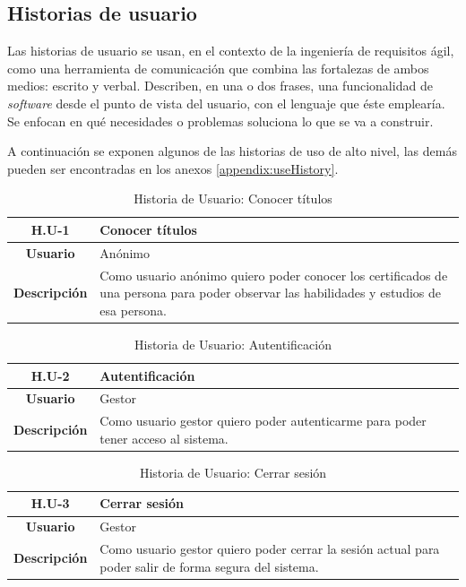 \subsection{Historias de usuario}
Las historias de usuario se usan, en el contexto de la ingeniería de requisitos ágil, como una herramienta de comunicación que combina las fortalezas de ambos medios: escrito y verbal. Describen, en una o dos frases, una funcionalidad de \textit{software} desde el punto de vista del usuario, con el lenguaje que éste emplearía. Se enfocan en qué necesidades o problemas soluciona lo que se va a construir.

A continuación se exponen algunos de las historias de uso de alto nivel, las demás pueden ser encontradas en los anexos \ref{appendix:useHistory}.

\begin{table}[!h]
	\begin{center}
		\begin{tabular}{|c|p{10cm}|}
		\hline \textbf{H.U-1} & Conocer títulos \\ 
		\hline \textbf{Usuario} & Anónimo\\ 
		\hline \textbf{Descripción} & Como usuario anónimo quiero poder conocer los certificados de una persona para poder observar las habilidades y estudios de esa persona. \\ 
		\hline 
		\end{tabular}
		\caption{Historia de Usuario: Conocer títulos}
		\label{tab:HU1}
	\end{center}
\end{table}

\begin{table}[!h]
	\begin{center}
		\begin{tabular}{|c|p{10cm}|}
		\hline \textbf{H.U-2} & Autentificación \\ 
		\hline \textbf{Usuario} & Gestor \\ 
		\hline \textbf{Descripción} & Como usuario gestor quiero poder autenticarme para poder tener acceso al sistema. \\ 
		\hline 
		\end{tabular}
		\caption{Historia de Usuario: Autentificación}
		\label{tab:HU2}
	\end{center}
\end{table}

\begin{table}[!h]
	\begin{center}
		\begin{tabular}{|c|p{10cm}|}
		\hline \textbf{H.U-3} & Cerrar sesión \\ 
		\hline \textbf{Usuario} & Gestor \\ 
		\hline \textbf{Descripción} & Como usuario gestor quiero poder cerrar la sesión actual para poder salir de forma segura del sistema. \\ 
		\hline 
		\end{tabular}
		\caption{Historia de Usuario: Cerrar sesión}
		\label{tab:HU3}
	\end{center}
\end{table}

